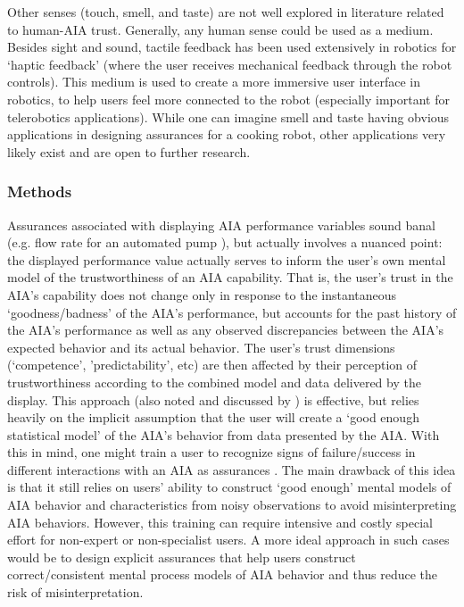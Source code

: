 Other senses (touch, smell, and taste) are not well explored in literature related to human-AIA trust. Generally, any human sense could be used as a medium. Besides sight and sound, tactile feedback has been used extensively in robotics for `haptic feedback' (where the user receives mechanical feedback through the robot controls). This medium is used to create a more immersive user interface in robotics, to help users feel more connected to the robot (especially important for telerobotics applications). 
While one can imagine smell and taste having obvious applications in designing assurances for a cooking robot, other applications very likely exist and are open to further research.

\subsubsection{Methods}
Assurances associated with displaying AIA performance variables sound banal (e.g. flow rate for an automated pump \cite{Muir1996-gt}), but actually involves a nuanced point: the displayed performance value actually serves to inform the user's own mental model of the trustworthiness of an AIA capability. That is, the user's trust in the AIA's capability does not change only in response to the instantaneous `goodness/badness' of the AIA's performance, but accounts for the past history of the AIA's performance as well as any observed discrepancies between the AIA's expected behavior and its actual behavior.  
The user's trust dimensions (`competence', 'predictability', etc) are then affected by their perception of trustworthiness according to the combined model and data delivered by the display. 
This approach (also noted and discussed by \cite{Wickens1999-la,Sheridan1984-kx,Hutchins2015-if}) is effective, but relies heavily on the implicit assumption that the user will create a `good enough statistical model' of the AIA's behavior from data presented by the AIA. With this in mind, one might train a user to recognize signs of failure/success in different interactions with an AIA as assurances \cite{Freedy2007-sg,Desai2012-rc,Salem2015-md}. 
The main drawback of this idea is that it still relies on users' ability to construct `good enough' mental models of AIA behavior and characteristics from noisy observations to avoid misinterpreting AIA behaviors. 
However, this training can require intensive and costly special effort for non-expert or non-specialist users. 
A more ideal approach in such cases would be to design explicit assurances that help users construct correct/consistent mental process models of AIA behavior and thus reduce the risk of misinterpretation.

